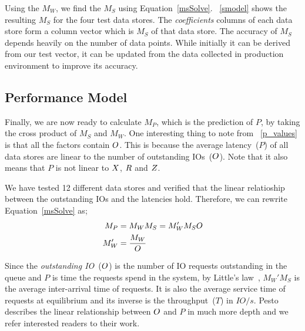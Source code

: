 Using the $M_W$, we find the $M_S$ using Equation~\ref{msSolve}.
\tablename~\ref{smodel} shows the resulting $M_S$ for the four test data stores.
The \emph{coefficients} columns of each data store form a column vector which is $M_S$ of that data store.
The accuracy of $M_S$ depends heavily on the number of data points.
While initially it can be derived from our test vector, it can be updated from the data collected in production environment to improve its accuracy.

\subsection{Performance Model}
Finally, we are now ready to calculate $M_P$, which is the prediction of $P$, by taking the cross product of $M_S$ and $M_W$.
One interesting thing to note from \tablename~\ref{p_values} is that all the factors contain $O$.
This is because the average latency~($P$) of all data stores are linear to the number of outstanding IOs~($O$).
Note that it also means that $P$ is not linear to $X$, $R$ and $Z$.

We have tested 12 different data stores and verified that the linear relatioship between the outstanding IOs and the latencies hold.
Therefore, we can rewrite Equation~\ref{msSolve} as;
\begin{equation}\label{rpm:eq}
\begin{split}
M_P&=M_WM_S=M_W'M_SO\\
M_W'&=\frac{M_W}{O}
\end{split}
\end{equation}

Since the \emph{outstanding IO}~($O$) is the number of IO requests outstanding in the queue and $P$ is time the requests spend in the system, by Little's law~\cite{little:1961}, $M_W'M_S$ is the average inter-arrival time of requests.
It is also the average service time of requests at equilibrium and its inverse is the throughput~($T$) in $\mathit{IO}/s$.
Pesto~\cite{gulati:2011} describes the linear relationship between $O$ and $P$ in much more depth and we refer interested readers to their work.

